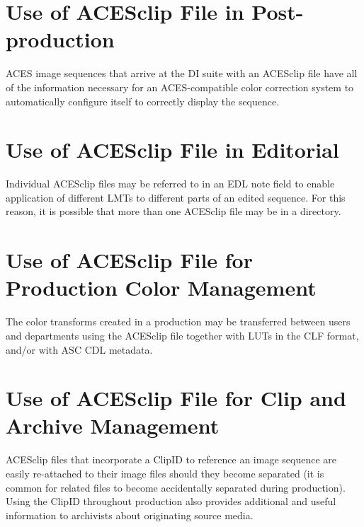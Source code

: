 \section{Use of ACESclip File in Post-production}
ACES image sequences that arrive at the DI suite with an ACESclip file have all of the information necessary for an ACES-compatible color correction system to automatically configure itself to correctly display the sequence.

\section{Use of ACESclip File in Editorial}
Individual ACESclip files may be referred to in an EDL note field to enable application of different LMTs to different parts of an edited sequence.  For this reason, it is possible that more than one ACESclip file may be in a directory.

\section{Use of ACESclip File for Production Color Management}
The color transforms created in a production may be transferred between users and departments using the ACESclip file together with LUTs in the CLF format, and/or with ASC CDL metadata.

\section{Use of ACESclip File for Clip and Archive Management}
ACESclip files that incorporate a ClipID to reference an image sequence are easily re-attached to their image files should they become separated (it is common for related files to become accidentally separated during production). Using the ClipID throughout production also provides additional and useful information to archivists about originating source media.